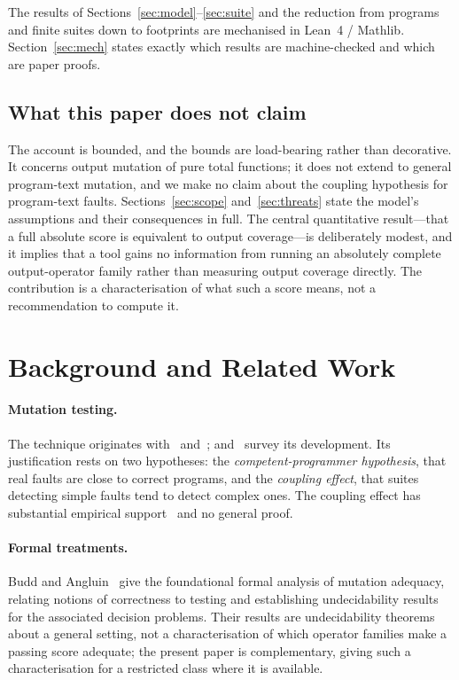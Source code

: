\documentclass[runningheads,envcountsect,envcountsame]{llncs}
\begin{document}
The results of Sections~\ref{sec:model}--\ref{sec:suite} and the reduction from
programs and finite suites down to footprints are mechanised in Lean~4 /
Mathlib. Section~\ref{sec:mech} states exactly which results are machine-checked
and which are paper proofs.

\subsection{What this paper does not claim}
\label{sec:notclaim}

The account is bounded, and the bounds are load-bearing rather than decorative.
It concerns output mutation of pure total functions; it does not extend to
general program-text mutation, and we make no claim about the coupling hypothesis
for program-text faults. Sections~\ref{sec:scope} and~\ref{sec:threats} state the
model's assumptions and their consequences in full. The central quantitative
result---that a full absolute score is equivalent to output coverage---is
deliberately modest, and it implies that a tool gains no information from running
an absolutely complete output-operator family rather than measuring output
coverage directly. The contribution is a characterisation of what such a score
means, not a recommendation to compute it.

\section{Background and Related Work}
\label{sec:related}

\paragraph{Mutation testing.}
The technique originates with~\cite{demillo1978} and~\cite{hamlet1977};
\cite{jia2011} and~\cite{papadakis2019} survey its development. Its justification
rests on two hypotheses: the \emph{competent-programmer hypothesis}, that real
faults are close to correct programs, and the \emph{coupling effect}, that suites
detecting simple faults tend to detect complex ones. The coupling effect has
substantial empirical support~\cite{offutt1992,just2014} and no general proof.

\paragraph{Formal treatments.}
Budd and Angluin~\cite{budd1982} give the foundational formal analysis of
mutation adequacy, relating notions of correctness to testing and establishing
undecidability results for the associated decision problems. Their results are
undecidability theorems about a general setting, not a characterisation of which
operator families make a passing score adequate; the present paper is
complementary, giving such a characterisation for a restricted class where it is
available.
\end{document}
